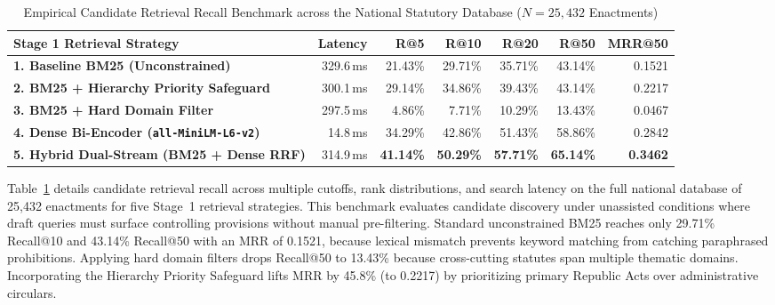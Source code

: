 \begin{table}[htbp]
    \centering
    \footnotesize
    \setlength{\tabcolsep}{5pt}
    \caption[Empirical Candidate Retrieval Recall Benchmark across National Database]{Empirical Candidate Retrieval Recall Benchmark across the National Statutory Database ($N = 25{,}432$ Enactments)}
    \label{tab:full_corpus_retrieval_benchmark}
    \begin{tabularx}{\linewidth}{>{\RaggedRight}Xrrrrrr}
        \toprule
        \textbf{Stage 1 Retrieval Strategy} & \textbf{Latency} & \textbf{R@5} & \textbf{R@10} & \textbf{R@20} & \textbf{R@50} & \textbf{MRR@50} \\
        \midrule
        \textbf{1. Baseline BM25 (Unconstrained)} & 329.6\,ms & 21.43\% & 29.71\% & 35.71\% & 43.14\% & 0.1521 \\
        \textbf{2. BM25 + Hierarchy Priority Safeguard} & 300.1\,ms & 29.14\% & 34.86\% & 39.43\% & 43.14\% & 0.2217 \\
        \textbf{3. BM25 + Hard Domain Filter} & 297.5\,ms & 4.86\% & 7.71\% & 10.29\% & 13.43\% & 0.0467 \\
        \textbf{4. Dense Bi-Encoder (\texttt{all-MiniLM-L6-v2})} & 14.8\,ms & 34.29\% & 42.86\% & 51.43\% & 58.86\% & 0.2842 \\
        \textbf{5. Hybrid Dual-Stream (BM25 + Dense RRF)} & 314.9\,ms & \textbf{41.14\%} & \textbf{50.29\%} & \textbf{57.71\%} & \textbf{65.14\%} & \textbf{0.3462} \\
        \bottomrule
    \end{tabularx}
\end{table}

Table~\ref{tab:full_corpus_retrieval_benchmark} details candidate retrieval recall across multiple cutoffs, rank distributions, and search latency on the full national database of 25,432 enactments for five Stage~1 retrieval strategies. This benchmark evaluates candidate discovery under unassisted conditions where draft queries must surface controlling provisions without manual pre-filtering. Standard unconstrained BM25 reaches only 29.71\% Recall@10 and 43.14\% Recall@50 with an MRR of 0.1521, because lexical mismatch prevents keyword matching from catching paraphrased prohibitions. Applying hard domain filters drops Recall@50 to 13.43\% because cross-cutting statutes span multiple thematic domains. Incorporating the Hierarchy Priority Safeguard lifts MRR by 45.8\% (to 0.2217) by prioritizing primary Republic Acts over administrative circulars.

